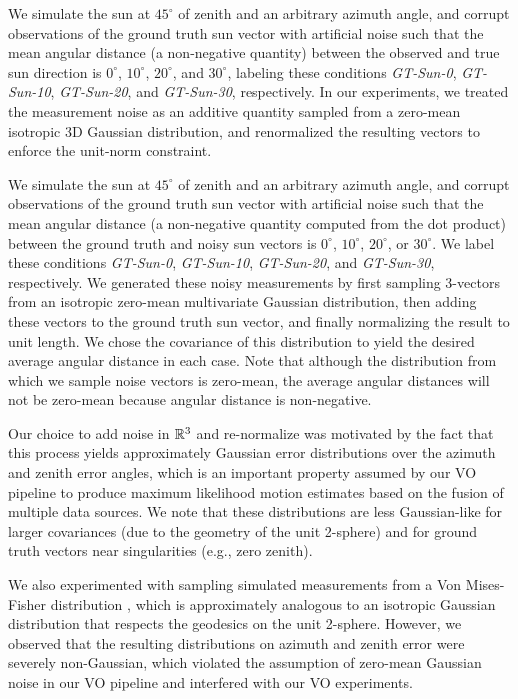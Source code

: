 We simulate the sun at $45^\circ$ of zenith and an arbitrary azimuth angle, and corrupt observations of the ground truth sun vector with artificial noise such that the mean angular distance (a non-negative quantity) between the observed and true sun direction is $0^\circ$, $10^\circ$, $20^\circ$, and $30^\circ$, labeling these conditions \emph{GT-Sun-0}, \emph{GT-Sun-10}, \emph{GT-Sun-20}, and \emph{GT-Sun-30}, respectively.
In our experiments, we treated the measurement noise as an additive quantity sampled from a zero-mean isotropic 3D Gaussian distribution, and renormalized the resulting vectors to enforce the unit-norm constraint.


We simulate the sun at $45^\circ$ of zenith and an arbitrary azimuth angle, and corrupt observations of the ground truth sun vector with artificial noise such that the mean angular distance (a non-negative quantity computed from the dot product) between the ground truth and noisy sun vectors is $0^\circ$, $10^\circ$, $20^\circ$, or $30^\circ$.
We label these conditions \emph{GT-Sun-0}, \emph{GT-Sun-10}, \emph{GT-Sun-20}, and \emph{GT-Sun-30}, respectively.
We generated these noisy measurements by first sampling \mbox{3-vectors} from an isotropic zero-mean multivariate Gaussian distribution, then adding these vectors to the ground truth sun vector, and finally normalizing the result to unit length. 
We chose the covariance of this distribution to yield the desired average angular distance in each case.
Note that although the distribution from which we sample noise vectors is zero-mean, the average angular distances will not be zero-mean because angular distance is non-negative.


Our choice to add noise in $\mathbb{R}^3$ and re-normalize was motivated by the fact that this process yields approximately Gaussian error distributions over the azimuth and zenith error angles, which is an important property assumed by our VO pipeline to produce maximum likelihood motion estimates based on the fusion of multiple data sources.
We note that these distributions are less Gaussian-like for larger covariances (due to the geometry of the unit 2-sphere) and for ground truth vectors near singularities (e.g., zero zenith).

We also experimented with sampling simulated measurements from a Von Mises-Fisher distribution \citep{fisher1953dispersion}, which is approximately analogous to an isotropic Gaussian distribution that respects the geodesics on the unit 2-sphere.
However, we observed that the resulting distributions on azimuth and zenith error were severely non-Gaussian, which violated the assumption of zero-mean Gaussian noise in our VO pipeline and interfered with our VO experiments.

